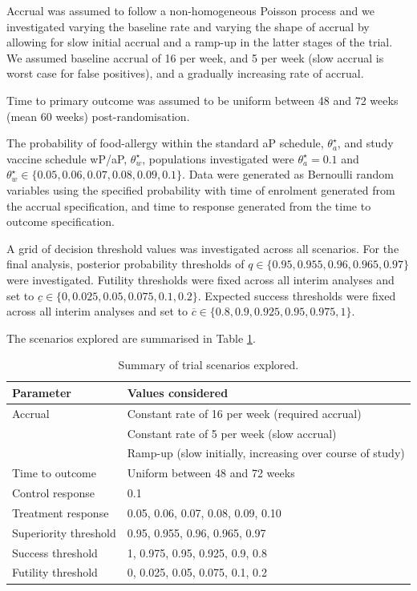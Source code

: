 \documentclass{bmcart}
\begin{document}
Accrual was assumed to follow a non-homogeneous Poisson process and we investigated varying the baseline rate and varying the shape of accrual by allowing for slow initial accrual and a ramp-up in the latter stages of the trial.
We assumed baseline accrual of 16 per week, and 5 per week (slow accrual is worst case for false positives), and a gradually increasing rate of accrual.

Time to primary outcome was assumed to be uniform between 48 and 72 weeks (mean 60 weeks) post-randomisation.

The probability of food-allergy within the standard aP schedule, $\theta_a^\star$, and study vaccine schedule wP/aP, $\theta_w^\star$, populations investigated were $\theta_a^\star=0.1$ and $\theta_w^\star\in\{0.05, 0.06, 0.07, 0.08, 0.09,0.1\}$.
Data were generated as Bernoulli random variables using the specified probability with time of enrolment generated from the accrual specification, and time to response generated from the time to outcome specification.

A grid of decision threshold values was investigated across all scenarios.
For the final analysis, posterior probability thresholds of $q\in\{0.95,0.955,0.96,0.965,0.97\}$ were investigated.
Futility thresholds were fixed across all interim analyses and set to $\underline{c}\in\{0,0.025,0.05,0.075,0.1,0.2\}$.
Expected success thresholds were fixed across all interim analyses and set to $\overline{c}\in\{0.8,0.9,0.925,0.95,0.975,1\}$.

The scenarios explored are summarised in Table \ref{tab:scenarios}.

\begin{table}[!ht]
	\caption{Summary of trial scenarios explored.}
	\label{tab:scenarios}
	\begin{tabular}{ll}
		Parameter & Values considered \\ \hline
		Accrual & Constant rate of 16 per week (required accrual) \\
		& Constant rate of 5 per week (slow accrual) \\
		& Ramp-up (slow initially, increasing over course of study) \\
		Time to outcome & Uniform between 48 and 72 weeks \\
		Control response & 0.1 \\
		Treatment response & 0.05, 0.06, 0.07, 0.08, 0.09, 0.10 \\
		Superiority threshold & 0.95, 0.955, 0.96, 0.965, 0.97 \\
		Success threshold & 1, 0.975, 0.95, 0.925, 0.9, 0.8 \\
		Futility threshold & 0, 0.025, 0.05, 0.075, 0.1, 0.2 \\
		\hline
	\end{tabular}
\end{table}
\end{document}
